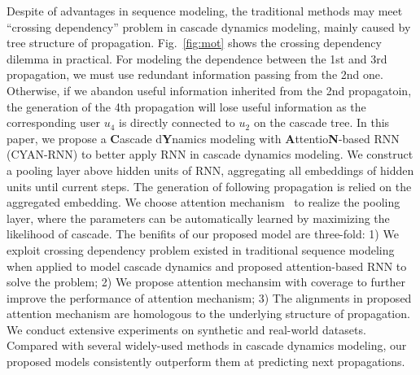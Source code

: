 Despite of advantages in sequence modeling, the traditional methods
may meet ``crossing dependency'' problem in cascade dynamics modeling, mainly
caused by
tree structure of propagation. Fig.~\ref{fig:mot} shows the crossing
dependency dilemma in practical. For modeling the dependence between the 1st
and 3rd propagation, we must use redundant information passing from the 2nd
one.
Otherwise, if we abandon useful information inherited from the 2nd propagatoin,
the generation of the 4th propagation will lose useful information as the
corresponding user $u_4$ is directly connected to $u_2$ on the cascade tree.
In this paper, we propose a \textbf{C}ascade d\textbf{Y}namics
modeling with \textbf{A}ttentio\textbf{N}-based RNN (CYAN-RNN) to better
apply RNN in cascade dynamics modeling. We construct a pooling
layer above hidden units of RNN, aggregating all embeddings of hidden units
until current steps. The generation of following propagation is relied on the
aggregated embedding. 
We choose attention mechanism~\cite{bahdanau2014neural} to realize the pooling layer,
where the parameters can be automatically learned by maximizing the
likelihood of cascade. 
The benifits of our proposed model are three-fold: 
1) We exploit crossing dependency problem existed in traditional sequence
modeling when applied to model cascade dynamics and proposed attention-based 
RNN to solve the problem;
2) We propose attention mechansim with coverage to further improve the
performance of attention mechanism;
3) The alignments in proposed attention mechanism are homologous to the
underlying structure of propagation.   
% 
% 
We conduct extensive experiments on synthetic
and real-world datasets. Compared with several widely-used methods in cascade
dynamics modeling, our proposed models consistently outperform them at
predicting next propagations. 

